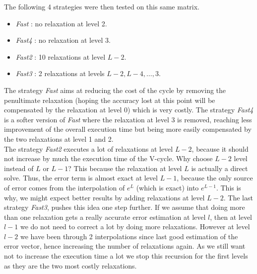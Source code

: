  The following 4 strategies were then tested on this same matrix.
  \begin{itemize}
   \item \emph{Fast} : no relaxation at level 2.
   \item \emph{Fast4} : no relaxation at level 3.
   \item \emph{Fast2} : 10 relaxations at level $L-2$.
   \item \emph{Fast3} : 2 relaxations at levels $L-2,L-4,\dots,3$.
  \end{itemize}
  The strategy \emph{Fast} aims at reducing the cost of the cycle by removing the penultimate relaxation (hoping the accuracy lost at this point will be compensated by the relaxation at level 0) which is very costly.
  The strategy \emph{Fast4} is a softer version of \emph{Fast} where the relaxation at level 3 is removed, reaching less improvement of the overall execution time but being more easily compensated by the two relaxations at level 1 and 2.\\
  The strategy \emph{Fast2} executes a lot of relaxations at level $L-2$, because it should not increase by much the execution time of the V-cycle. Why choose $L-2$ level instead of $L$ or $L-1$?
  This because the relaxation at level $L$ is actually a direct solve. Thus, the error term is almost exact at level $L-1$, because the only source of error
  comes from the interpolation of $e^L$ (which is exact) into $e^{L-1}$. This is why, we might expect better results by adding relaxations at level $L-2$.
  The last strategy \emph{Fast3}, pushes this idea one step further. If we assume that doing more than one relaxation gets a really accurate error estimation at level $l$, then
  at level $l-1$ we do not need to correct a lot by doing more relaxations. However at level $l-2$ we have been through 2 interpolations since last good estimation of the error vector, hence increasing the number of relaxations again.
  As we still want not to increase the execution time a lot we stop this recursion for the first levels as they are the two most costly relaxations.
  
